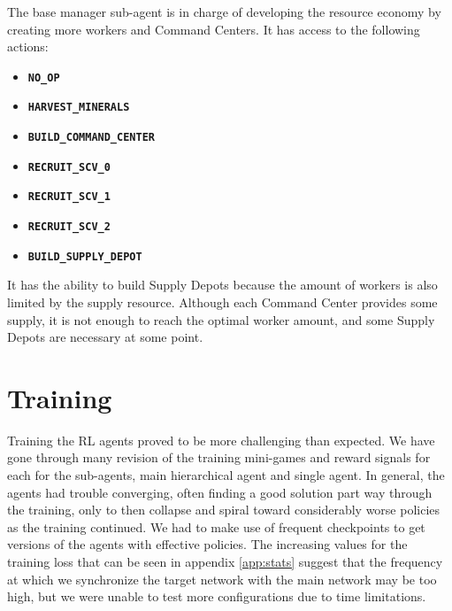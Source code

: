 The base manager sub-agent is in charge of developing the resource economy by creating more workers and Command Centers. It has access to the following actions:

\begin{multicols}{2}
\begin{itemize}
    \item \textbf{\texttt{NO\_OP}}
    \item \textbf{\texttt{HARVEST\_MINERALS}}
    \item \textbf{\texttt{BUILD\_COMMAND\_CENTER}}
    \item \textbf{\texttt{RECRUIT\_SCV\_0}}
    \item \textbf{\texttt{RECRUIT\_SCV\_1}}
    \item \textbf{\texttt{RECRUIT\_SCV\_2}}
    \item \textbf{\texttt{BUILD\_SUPPLY\_DEPOT}}
\end{itemize}
\end{multicols}

It has the ability to build Supply Depots because the amount of workers is also limited by the supply resource. Although each Command Center provides some supply, it is not enough to reach the optimal worker amount, and some Supply Depots are necessary at some point.

\section{Training}
\label{sec:training}

Training the RL agents proved to be more challenging than expected. We have gone through many revision of the training mini-games and reward signals for each for the sub-agents, main hierarchical agent and single agent. In general, the agents had trouble converging, often finding a good solution part way through the training, only to then collapse and spiral toward considerably worse policies as the training continued. We had to make use of frequent checkpoints to get versions of the agents with effective policies. The increasing values for the training loss that can be seen in appendix \ref{app:stats} suggest that the frequency at which we synchronize the target network with the main network may be too high, but we were unable to test more configurations due to time limitations.

